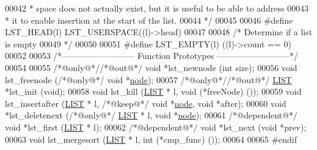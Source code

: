 \begin{DoxyCode}
00042 \textcolor{comment}{ * space does not actually exist, but it is useful to be able to address}
00043 \textcolor{comment}{ * it to enable insertion at the start of the list.}
00044 \textcolor{comment}{ */}
00045 
00046 \textcolor{preprocessor}{#define LST\_HEAD(l)   LST\_USERSPACE((l)->head)}
00047 
00048 \textcolor{comment}{/* Determine if a list is empty}
00049 \textcolor{comment}{ */}
00050 
00051 \textcolor{preprocessor}{#define LST\_EMPTY(l)    ((l)->count == 0)}
00052 
00053 \textcolor{comment}{/*-------------------------- Function Prototypes --------------------------*/}
00054 
00055 \textcolor{comment}{/*@only@*/}\textcolor{comment}{/*@out@*/} \textcolor{keywordtype}{void} *lst\_newnode (\textcolor{keywordtype}{int} size);
00056 \textcolor{keywordtype}{void} lst\_freenode (\textcolor{comment}{/*@only@*/} \textcolor{keywordtype}{void} *\hyperlink{group__data__structures_structnode}{node});
00057 \textcolor{comment}{/*@only@*/}\textcolor{comment}{/*@out@*/}  \hyperlink{structLIST}{LIST} *lst\_init (\textcolor{keywordtype}{void});
00058 \textcolor{keywordtype}{void} lst\_kill (\hyperlink{structLIST}{LIST} * l, \textcolor{keywordtype}{void} (*freeNode) ());
00059 \textcolor{keywordtype}{void} lst\_insertafter (\hyperlink{structLIST}{LIST} * l, \textcolor{comment}{/*@keep@*/} \textcolor{keywordtype}{void} *\hyperlink{group__data__structures_structnode}{node}, \textcolor{keywordtype}{void} *after);
00060 \textcolor{keywordtype}{void} *lst\_deletenext (\textcolor{comment}{/*@only@*/} \hyperlink{structLIST}{LIST} * l, \textcolor{keywordtype}{void} *\hyperlink{group__data__structures_structnode}{node});
00061 \textcolor{comment}{/*@dependent@*/} \textcolor{keywordtype}{void} *lst\_first (\hyperlink{structLIST}{LIST} * l);
00062 \textcolor{comment}{/*@dependent@*/} \textcolor{keywordtype}{void} *lst\_next (\textcolor{keywordtype}{void} *prev);
00063 \textcolor{keywordtype}{void} lst\_mergesort (\hyperlink{structLIST}{LIST} * l, \textcolor{keywordtype}{int} (*cmp\_func) ());
00064 
00065 \textcolor{preprocessor}{#endif}
\end{DoxyCode}
